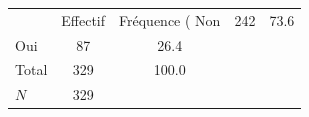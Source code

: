 {
\def\sym#1{\ifmmode^{#1}\else\(^{#1}\)\fi}
\begin{tabular}{l*{1}{cc}}
\toprule
            &    Effectif&Fréquence (%
\midrule
Non         &         242&        73.6\\
Oui         &          87&        26.4\\
Total       &         329&       100.0\\
\midrule
\(N\)       &         329&            \\
\bottomrule
\end{tabular}
}
